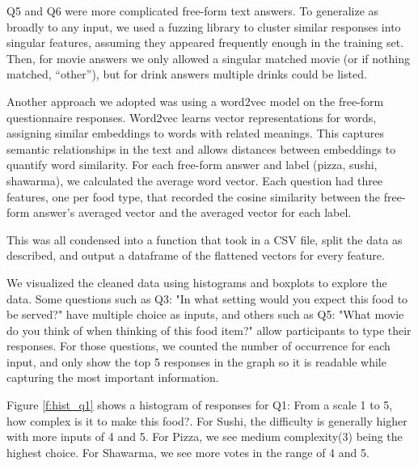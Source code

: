 Q5 and Q6 were more complicated free-form text answers. To generalize as broadly to any input, we used a fuzzing library to cluster similar responses into singular features, assuming they appeared frequently enough in the training set. Then, for movie answers we only allowed a singular matched movie (or if nothing matched, “other”), but for drink answers multiple drinks could be listed.

Another approach we adopted was using a word2vec model on the free-form questionnaire responses. Word2vec learns vector representations for words, assigning similar embeddings to words with related meanings. This captures semantic relationships in the text and allows distances between embeddings to quantify word similarity. For each free-form answer and label (pizza, sushi, shawarma), we calculated the average word vector. Each question had three features, one per food type, that recorded the cosine similarity between the free-form answer's averaged vector and the averaged vector for each label.

This was all condensed into a function that took in a CSV file, split the data as described, and output a dataframe of the flattened vectors for every feature.

We visualized the cleaned data using histograms and boxplots to explore the data. Some questions such as Q3: "In what setting 
would you expect this food to be served?" have multiple choice as inputs, and others such as Q5: "What movie do you think of when thinking of this food item?"
allow participants to type their responses. For those questions, we counted the number of occurrence for each input, and only show the top 5 responses in the graph 
so it is readable while capturing the most important information.

Figure \ref{f:hist_q1} shows a histogram of responses for Q1: From a scale 1 to 5, how complex is it to make this food?. For Sushi, 
the difficulty is generally higher with more inputs of 4 and 5. For Pizza, we see medium complexity(3) being the highest choice. For Shawarma,
we see more votes in the range of 4 and 5.

